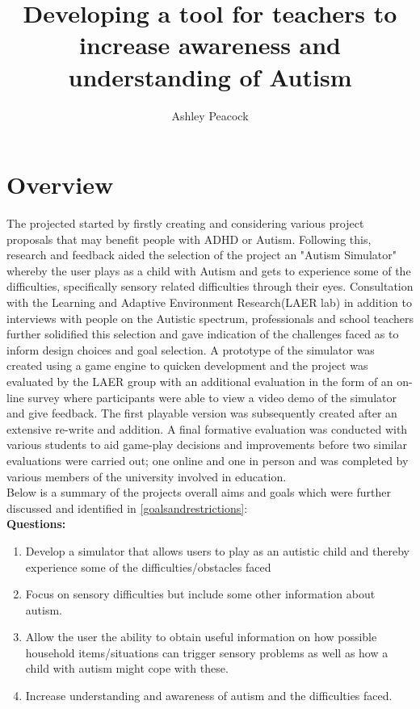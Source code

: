 \documentclass[11pt]{report}
\begin{document}
\title{Developing a tool for teachers to increase awareness and understanding of Autism}
\author{Ashley Peacock}
\maketitle
\tableofcontents

\chapter{Overview}

The projected started by firstly creating and considering various project proposals that may benefit people with ADHD or Autism. Following this, research and feedback aided the selection of the project an "Autism Simulator" whereby the user plays as a child with Autism and gets to experience some of the difficulties, specifically sensory related difficulties through their eyes. Consultation with the Learning and Adaptive Environment Research(LAER lab) in addition to interviews with people on the Autistic spectrum, professionals and school teachers further solidified this selection and gave indication of the challenges faced as to inform design choices and goal selection. A prototype of the simulator was created using a game engine to quicken development and the project was evaluated by the LAER group with an additional evaluation in the form of an on-line survey where participants were able to view a video demo of the simulator and give feedback. The first playable version was subsequently created after an extensive re-write and addition. A final formative evaluation was conducted with various students to aid game-play decisions and improvements before two similar evaluations were carried out; one online and one in person and was completed by various members of the university involved in education. \\

Below is a summary of the projects overall aims and goals which were further discussed and identified in \ref{goalsandrestrictions}:\\
\textbf{Questions:}\\
\begin{enumerate}
\item Develop a simulator that allows users to play as an autistic child and thereby experience some of the difficulties/obstacles faced
\item Focus on sensory difficulties but include some other information about autism.
\item Allow the user the ability to obtain useful information on how possible household items/situations can trigger sensory problems as well as how a child with autism might cope with these.
\item Increase understanding and awareness of autism and the difficulties faced.
\end{enumerate}
\end{document}
